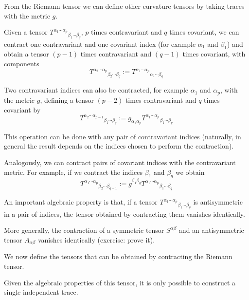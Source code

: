 \begin{points}
\item From the Riemann tensor we can define other curvature tensors by taking traces with the metric $g$.

\item Given a tensor $T^{\alpha_1\cdots\alpha_p}{}_{\beta_1\cdots\beta_q}$, $p$ times contravariant and $q$ times covariant, we can contract one contravariant and one covariant index (for example $\alpha_1$ and $\beta_1$) and obtain a tensor $(p-1)$ times contravariant and $(q-1)$ times covariant, with components
\[
  T^{\alpha_2\cdots\alpha_p}{}_{\beta_2\cdots\beta_q}:=T^{\alpha_1\cdots\alpha_p}{}_{\alpha_1\cdots\beta_q}
\]

\item Two contravariant indices can also be contracted, for example $\alpha_1$ and $\alpha_p$, with the metric $g$, defining a tensor $(p-2)$ times contravariant and $q$ times covariant by
\[
  T^{\alpha_2\cdots\alpha_{p-1}}{}_{\beta_1\cdots\beta_q}:=g_{\alpha_1\alpha_p}T^{\alpha_1\cdots\alpha_p}{}_{\beta_1\cdots\beta_q}
\]

\item This operation can be done with any pair of contravariant indices (naturally, in general the result depends on the indices chosen to perform the contraction).

\item Analogously, we can contract pairs of covariant indices with the contravariant metric. For example, if we contract the indices $\beta_1$ and $\beta_q$ we obtain
\[
  T^{\alpha_1\cdots\alpha_p}{}_{\beta_2\cdots\beta_{q-1}}:=g^{\beta_1\beta_q}T^{\alpha_1\cdots\alpha_p}{}_{\beta_1\cdots\beta_q}
\]

\item An important algebraic property is that, if a tensor $T^{\alpha_1\cdots\alpha_p}{}_{\beta_1\cdots\beta_q}$ is antisymmetric in a pair of indices, the tensor obtained by contracting them vanishes identically.

\item More generally, the contraction of a symmetric tensor $S^{\alpha\beta}$ and an antisymmetric tensor $A_{\alpha\beta}$ vanishes identically (exercise: prove it).

\item We now define the tensors that can be obtained by contracting the Riemann tensor.

\item Given the algebraic properties of this tensor, it is only possible to construct a single independent trace.


\end{points}
